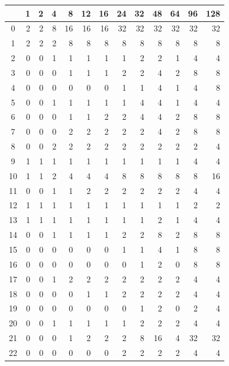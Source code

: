 \documentclass[11pt,a4paper,openright,twoside]{book}
\numberwithin{equation}{section} %
\numberwithin{figure}{section} %
\numberwithin{table}{section} %
\begin{document}
\begin{table}[h]
	\centering
	\small
	\def\arraystretch{0.85}
	\begin{tabular}{c|rrrrrrrrrrrr}
		\diagbox{\acs{IPM}}{System} &
		1 & 2 & 4 & 8  & 12 & 16 & 24 & 32 & 48 & 64 & 96 & 128 \\
		\hline
		0 & 2 & 2 & 8 & 16 & 16 & 16 & 32 & 32 & 32 & 32 & 32 & 32 \\
		1 & 2 & 2 & 2 & 8  & 8  & 8  & 8  & 8  & 8  & 8  & 8  & 8 \\
		2 & 0 & 0 & 1 & 1  & 1  & 1  & 1  & 2  & 2  & 1  & 4  & 4 \\
		3 & 0 & 0 & 0 & 1  & 1  & 1  & 2  & 2  & 4  & 2  & 8  & 8 \\
		4 & 0 & 0 & 0 & 0  & 0  & 0  & 1  & 1  & 4  & 1  & 4  & 8 \\
		5 & 0 & 0 & 1 & 1  & 1  & 1  & 1  & 4  & 4  & 1  & 4  & 4 \\
		6 & 0 & 0 & 0 & 1  & 1  & 2  & 2  & 4  & 4  & 2  & 8  & 8 \\
		7 & 0 & 0 & 0 & 2  & 2  & 2  & 2  & 2  & 4  & 2  & 8  & 8 \\
		8 & 0 & 0 & 2 & 2  & 2  & 2  & 2  & 2  & 2  & 2  & 2  & 4 \\
		9 & 1 & 1 & 1 & 1  & 1  & 1  & 1  & 1  & 1  & 1  & 4  & 4 \\
		10 & 1 & 1 & 2 & 4  & 4  & 4  & 8  & 8  & 8  & 8  & 8  & 16 \\
		11 & 0 & 0 & 1 & 1  & 2  & 2  & 2  & 2  & 2  & 2  & 4  & 4 \\
		12 & 1 & 1 & 1 & 1  & 1  & 1  & 1  & 1  & 1  & 1  & 2  & 2 \\
		13 & 1 & 1 & 1 & 1  & 1  & 1  & 1  & 1  & 2  & 1  & 4  & 4 \\
		14 & 0 & 0 & 1 & 1  & 1  & 1  & 2  & 2  & 8  & 2  & 8  & 8 \\
		15 & 0 & 0 & 0 & 0  & 0  & 0  & 1  & 1  & 4  & 1  & 8  & 8 \\
		16 & 0 & 0 & 0 & 0  & 0  & 0  & 0  & 1  & 2  & 0  & 8  & 8 \\
		17 & 0 & 0 & 1 & 2  & 2  & 2  & 2  & 2  & 2  & 2  & 4  & 4 \\
		18 & 0 & 0 & 0 & 0  & 1  & 1  & 2  & 2  & 2  & 2  & 4  & 4 \\
		19 & 0 & 0 & 0 & 0  & 0  & 0  & 0  & 1  & 2  & 0  & 2  & 4 \\
		20 & 0 & 0 & 1 & 1  & 1  & 1  & 1  & 2  & 2  & 2  & 4  & 4 \\
		21 & 0 & 0 & 0 & 1  & 2  & 2  & 2  & 8  & 16 & 4  & 32 & 32 \\
		22 & 0 & 0 & 0 & 0  & 0  & 0  & 2  & 2  & 2  & 2  & 4  & 4 \\

\end{tabular}
\end{table}
\end{document}
